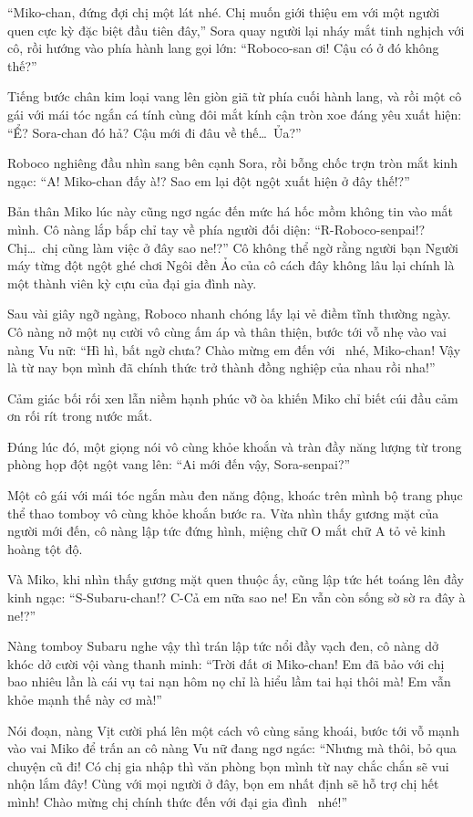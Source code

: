 \documentclass[../main.tex]{subfiles}
\begin{document}
``Miko-chan, đứng đợi chị một lát nhé. Chị muốn giới thiệu em với một người quen cực kỳ đặc biệt đầu tiên đây,'' Sora quay người lại nháy mắt tinh nghịch với cô, rồi hướng vào phía hành lang gọi lớn: ``Roboco-san ơi! Cậu có ở đó không thế?''

Tiếng bước chân kim loại vang lên giòn giã từ phía cuối hành lang, và rồi một cô gái với mái tóc ngắn cá tính cùng đôi mắt kính cận tròn xoe đáng yêu xuất hiện: ``Ể? Sora-chan đó hả? Cậu mới đi đâu về thế\dots\ Ủa?''

Roboco nghiêng đầu nhìn sang bên cạnh Sora, rồi bỗng chốc trợn tròn mắt kinh ngạc: ``A! Miko-chan đấy à!? Sao em lại đột ngột xuất hiện ở đây thế!?''

Bản thân Miko lúc này cũng ngơ ngác đến mức há hốc mồm không tin vào mắt mình. Cô nàng lắp bắp chỉ tay về phía người đối diện: ``R-Roboco-senpai!? Chị\dots\ chị cũng làm việc ở đây sao ne!?'' Cô không thể ngờ rằng người bạn Người máy từng đột ngột ghé chơi Ngôi đền Ảo của cô cách đây không lâu lại chính là một thành viên kỳ cựu của đại gia đình này.

Sau vài giây ngỡ ngàng, Roboco nhanh chóng lấy lại vẻ điềm tĩnh thường ngày. Cô nàng nở một nụ cười vô cùng ấm áp và thân thiện, bước tới vỗ nhẹ vào vai nàng Vu nữ: ``Hì hì, bất ngờ chưa? Chào mừng em đến với \hll\ nhé, Miko-chan! Vậy là từ nay bọn mình đã chính thức trở thành đồng nghiệp của nhau rồi nha!''

Cảm giác bối rối xen lẫn niềm hạnh phúc vỡ òa khiến Miko chỉ biết cúi đầu cảm ơn rối rít trong nước mắt.

Đúng lúc đó, một giọng nói vô cùng khỏe khoắn và tràn đầy năng lượng từ trong phòng họp đột ngột vang lên: ``Ai mới đến vậy, Sora-senpai?''

Một cô gái với mái tóc ngắn màu đen năng động, khoác trên mình bộ trang phục thể thao tomboy vô cùng khỏe khoắn bước ra. Vừa nhìn thấy gương mặt của người mới đến, cô nàng lập tức đứng hình, miệng chữ O mắt chữ A tỏ vẻ kinh hoàng tột độ.

Và Miko, khi nhìn thấy gương mặt quen thuộc ấy, cũng lập tức hét toáng lên đầy kinh ngạc: ``S-Subaru-chan!? C-Cả em nữa sao ne! En vẫn còn sống sờ sờ ra đây à ne!?''

Nàng tomboy Subaru nghe vậy thì trán lập tức nổi đầy vạch đen, cô nàng dở khóc dở cười vội vàng thanh minh: ``Trời đất ơi Miko-chan! Em đã bảo với chị bao nhiêu lần là cái vụ tai nạn hôm nọ chỉ là hiểu lầm tai hại thôi mà! Em vẫn khỏe mạnh thế này cơ mà!''

Nói đoạn, nàng Vịt cười phá lên một cách vô cùng sảng khoái, bước tới vỗ mạnh vào vai Miko để trấn an cô nàng Vu nữ đang ngơ ngác: ``Nhưng mà thôi, bỏ qua chuyện cũ đi! Có chị gia nhập thì văn phòng bọn mình từ nay chắc chắn sẽ vui nhộn lắm đây! Cùng với mọi người ở đây, bọn em nhất định sẽ hỗ trợ chị hết mình! Chào mừng chị chính thức đến với đại gia đình \hll\ nhé!''
\end{document}
